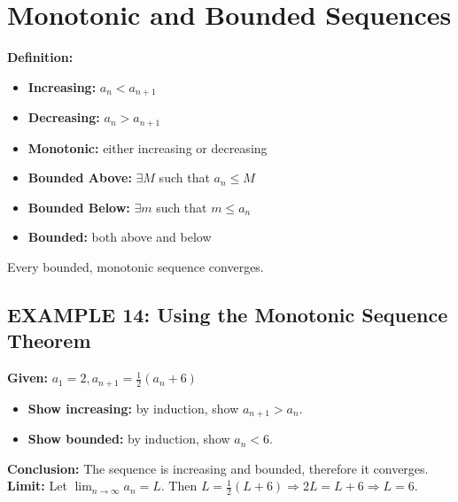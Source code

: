 \documentclass{article}
\begin{document}
\section*{Monotonic and Bounded Sequences}
\textbf{Definition:}
\begin{itemize}
    \item \textbf{Increasing:} \( a_n < a_{n+1} \)
    \item \textbf{Decreasing:} \( a_n > a_{n+1} \)
    \item \textbf{Monotonic:} either increasing or decreasing
    \item \textbf{Bounded Above:} \( \exists M \) such that \( a_n \leq M \)
    \item \textbf{Bounded Below:} \( \exists m \) such that \( m \leq a_n \)
    \item \textbf{Bounded:} both above and below
\end{itemize}

\begin{tcolorbox}[colback=white, colframe=orange!80!white, title=Monotonic Sequence Theorem, boxrule=0.5mm, arc=3mm]
Every bounded, monotonic sequence converges.
\end{tcolorbox}

\subsection*{EXAMPLE 14: Using the Monotonic Sequence Theorem}
\textbf{Given:} \( a_1 = 2, a_{n+1} = \frac{1}{2}(a_n + 6) \)
\begin{itemize}
    \item \textbf{Show increasing:} by induction, show \( a_{n+1} > a_n \).
    \item \textbf{Show bounded:} by induction, show \( a_n < 6 \).
\end{itemize}
\textbf{Conclusion:} The sequence is increasing and bounded, therefore it converges. \\
\textbf{Limit:} Let \(\lim_{n\to\infty} a_n = L\). Then \( L = \frac{1}{2}(L + 6) \Rightarrow 2L = L+6 \Rightarrow L = 6 \).
\end{document}
